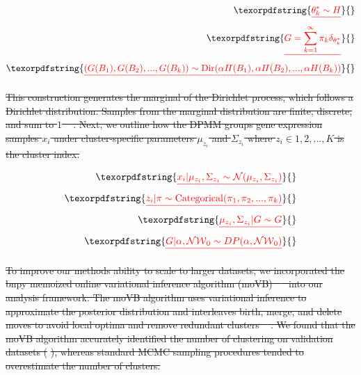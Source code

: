 \documentclass[10pt,letterpaper]{article}
\providecommand{\DIFdeltex}[1]{{\protect\color{red}\sout{#1}}}                      %
\providecommand{\DIFdel}[1]{\texorpdfstring{\DIFdeltex{#1}}{}} %
\begin{document}
\begin{align*}
\DIFdel{\theta_k^{*} \sim H }\\
\DIFdel{G = \sum_{k=1}^{\infty} \pi_k \delta_{\theta_k^{*}} }\\
\DIFdel{(G(B_1), G(B_2), ..., G(B_k)) \sim \text{Dir}(\alpha H(B_1), \alpha H(B_2), ..., \alpha H(B_k))
}\end{align*}

\DIFdel{This construction generates the marginal of the Dirichlet process, which follows a Dirichlet distribution. Samples from the marginal distribution are finite, discrete, and sum to $1$ \mbox{%
\cite{fergusonBayesianAnalysisNonparametric1973}}\hspace{0pt}%
. Next, we outline how the DPMM groups gene expression samples $x_i$ under cluster-specific parameters $\mu_{z_i}$ and $\Sigma_{z_i}$ where $z_i \in {1, 2, ..., K}$ is the cluster index.
}%

\begin{align*}
\DIFdel{%
x_i | \mu_{z_i}, \Sigma_{z_i} \sim \mathcal{N}(\mu_{z_i}, \Sigma_{z_i}) }\\
\DIFdel{z_i | \pi \sim \text{Categorical}(\pi_1, \pi_2, ..., \pi_k) }\\
\DIFdel{\mu_{z_i}, \Sigma_{z_i} | G \sim G }\\
\DIFdel{G | \alpha, \mathcal{NW}_0 \sim DP(\alpha, \mathcal{NW}_0)
}\end{align*}

\DIFdel{To improve our methods ability to scale to larger datasets, we incorporated the bnpy memoized online variational inference algorithm (moVB) \mbox{%
\cite{hughes2013memoized} }\hspace{0pt}%
into our analysis framework. The moVB algorithm uses variational inference to approximate the posterior distribution and interleaves birth, merge, and delete moves to avoid local optima and remove redundant clusters \mbox{%
\cite{hughesBnpyReliableScalable}}\hspace{0pt}%
. We found that the moVB algorithm accurately identified the number of clustering on validation datasets (}%
\DIFdel{), whereas standard MCMC sampling procedures tended to overestimate the number of clusters.
}%

\end{document}
